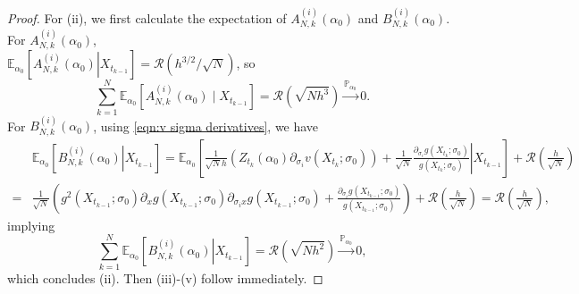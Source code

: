 \documentclass[a4paper,12pt]{article}
\numberwithin{equation}{section}
\theoremstyle{plain}
\theoremstyle{definition}
\begin{document}
\begin{appendix}
\begin{proof}
    For (ii), we first calculate the expectation of $A^{(i)}_{N,k}(\alpha_0)$ and $ B^{(i)}_{N,k}(\alpha_0)$. For $A^{(i)}_{N,k}(\alpha_0)$,\\   $\mathbb{E}_{\alpha_0}\left[\left.A^{(i)}_{N,k}(\alpha_0)\right| X_{t_{k-1}}\right]=\mathcal{R}(h^{3/2}/\sqrt{N})$, so
   \begin{equation*}
        \sum_{k=1}^N \mathbb{E}_{\alpha_0}\left[A_{N, k}^{(i)}\left(\alpha_0\right) \mid X_{t_{k-1}}\right]=\mathcal{R}(\sqrt{Nh^3})\xrightarrow{\mathbb{P}_{\alpha_0}} 0.
    \end{equation*}
    For $B^{(i)}_{N,k}(\alpha_0)$, using \eqref{eqn:v sigma derivatives}, we have 
    \begin{align*}
        &\mathbb{E}_{\alpha_0}\left[\left.B^{(i)}_{N,k}(\alpha_0)\right| X_{t_{k-1}}\right] =\mathbb{E}_{\alpha_0}\left[\left.\frac{1}{\sqrt{N}h}\left(Z_{t_k}(\alpha_0)\partial_{\sigma_i}v(X_{t_k};\sigma_0)\right)+\frac{1}{\sqrt{N}}\frac{\partial_{\sigma_i}g(X_{t_k};\sigma_0)}{g(X_{t_k};\sigma_0)}\right|X_{t_{k-1}}\right]+\mathcal{R}\left(\frac{h}{\sqrt{N}}\right)\\
        =&\frac{1}{\sqrt{N}}\left(g^2(X_{{t_{k-1}}};\sigma_0)\partial_xg(X_{t_{k-1}};\sigma_0)\partial_{\sigma_ix}g(X_{t_{k-1}};\sigma_0)+\frac{\partial_{\sigma_i}g(X_{t_{k-1}};\sigma_0)}{g(X_{t_{k-1}};\sigma_0)}\right)+\mathcal{R}\left(\frac{h}{\sqrt{N}}\right)=\mathcal{R}\left(\frac{h}{\sqrt{N}}\right),
    \end{align*}
    implying
    \begin{equation*}
        \sum_{k=1}^N \mathbb{E}_{\alpha_0}\left[\left.B^{(i)}_{N,k}(\alpha_0)\right| X_{t_{k-1}}\right]=\mathcal{R}(\sqrt{Nh^2})\xrightarrow{\mathbb{P}_{\alpha_0}} 0,
    \end{equation*}
    which concludes (ii). Then (iii)-(v) follow immediately.
    

\end{proof}
\end{appendix}
\end{document}
